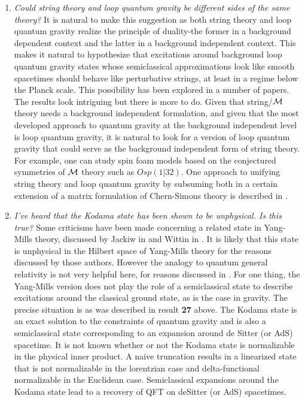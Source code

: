 \documentclass[12pt]{article}
\begin{document}
\begin{enumerate}
\item{}{\it    Could string theory and loop quantum gravity be different sides of the same
theory?}   It is natural 
to make this suggestion as both string theory and loop quantum gravity realize the principle 
of duality-the former in a background dependent context and the latter in a background
independent context.  This makes it natural to hypothesize that excitations around 
background loop quantum gravity states whose semiclassical approximations look
like smooth spacetimes should behave like  perturbative strings, at least in a regime
below the Planck scale.  This possibility has been explored
in a number of papers\cite{Mlee}.  The results look intriguing but there is more to do. 
Given that string/$\cal M$ theory needs a background independent formulation, and given
that the most developed approach to quantum gravity at the background independent
level is loop quantum gravity, it is natural to look for a version of loop quantum gravity
that could serve as the background independent form of string theory.  For example,
one can study spin foam models based on the conjectured symmetries of $\cal M$
theory such as $Osp(1|32)$.  One approach to unifying string theory and loop
quantum gravity by subsuming both in a certain extension of a matrix formulation
of Chern-Simons theory is described in \cite{Mlee}.  

\item{}{\it I've heard that the Kodama state has been shown to be unphysical.  Is this true?}
Some criticisms have been made concerning a related state in Yang-Mills theory, discussed
by Jackiw in \cite{jackiw-kodama} and Wittin in \cite{witten-kodama}.  It is likely that this state is
unphysical in the Hilbert space of Yang-Mills theory for the reasons discussed by those authors. 
However the analogy to quantum general relativity is not very helpful here, for reasons discussed
in \cite{laurentlee}.    For one thing, the Yang-Mills version does not play the role of a semiclassical
state to describe excitations around the classical ground state, as is the case in gravity.  
The precise situation is as was described in result {\bf 27} above.  The Kodama state is an
exact solution to the constraints of quantum gravity and is also a semiclassical state corresponding
to an expansion around de Sitter (or AdS) spacetime\cite{kodama}.  It is not known whether
or not the Kodama state is normalizable in the physical inner product.  A naive truncation 
results in a linearized state that is not normalizable in the lorentzian case and delta-functional
normalizable in the Euclidean case\cite{laurentlee}.  Semiclassical expansions around the Kodama state
lead to a recovery of QFT on deSitter (or AdS) spacetimes\cite{chopinlee,positive}.  




\end{enumerate}
\end{document}
